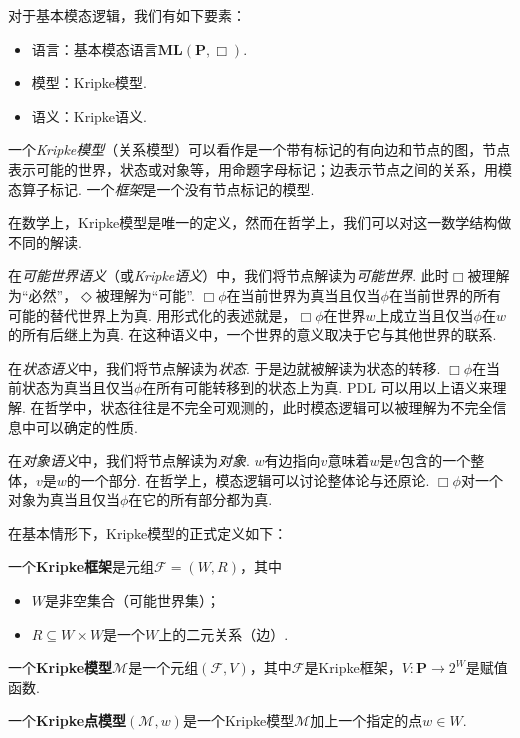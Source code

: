对于基本模态逻辑，我们有如下要素：
\begin{itemize}
    \item 语言：基本模态语言$\mathbf{ML}(\mathbf P, \Box)$.
    \item 模型：Kripke模型.
    \item 语义：Kripke语义.
\end{itemize}

一个\emph{Kripke模型}（关系模型）可以看作是一个带有标记的有向边和节点的图，节点表示可能的世界，状态或对象等，用命题字母标记；边表示节点之间的关系，用模态算子标记. 一个\emph{框架}是一个没有节点标记的模型.

在数学上，Kripke模型是唯一的定义，然而在哲学上，我们可以对这一数学结构做不同的解读. 

在\emph{可能世界语义}（或\emph{Kripke语义}）中，我们将节点解读为\emph{可能世界}. 此时$\Box$被理解为“必然”，$\Diamond$被理解为“可能”. $\Box\phi$在当前世界为真当且仅当$\phi$在当前世界的所有可能的替代世界上为真. 用形式化的表述就是，$\Box\phi$在世界$w$上成立当且仅当$\phi$在$w$的所有后继上为真. 在这种语义中，一个世界的意义取决于它与其他世界的联系.

在\emph{状态语义}中，我们将节点解读为\emph{状态}. 于是边就被解读为状态的转移. $\Box\phi$在当前状态为真当且仅当$\phi$在所有可能转移到的状态上为真. PDL 可以用以上语义来理解. 在哲学中，状态往往是不完全可观测的，此时模态逻辑可以被理解为不完全信息中可以确定的性质.

在\emph{对象语义}中，我们将节点解读为\emph{对象}. $w$有边指向$v$意味着$w$是$v$包含的一个整体，$v$是$w$的一个部分. 在哲学上，模态逻辑可以讨论整体论与还原论. $\Box\phi$对一个对象为真当且仅当$\phi$在它的所有部分都为真.

在基本情形下，Kripke模型的正式定义如下：

\begin{definition}
    一个\textbf{Kripke框架}是元组$\mathcal F=(W,R)$，其中
    \begin{itemize}
        \item $W$是非空集合（可能世界集）；
        \item $R\subseteq W\times W$是一个$W$上的二元关系（边）.
    \end{itemize}

    一个\textbf{Kripke模型}$\mathcal{M}$是一个元组$(\mathcal F,V)$，其中$\mathcal F$是Kripke框架，$V:\mathbf P\to 2^W$是赋值函数.

    一个\textbf{Kripke点模型}$(\mathcal{M},w)$是一个Kripke模型$\mathcal M$加上一个指定的点$w\in W$.
\end{definition}

